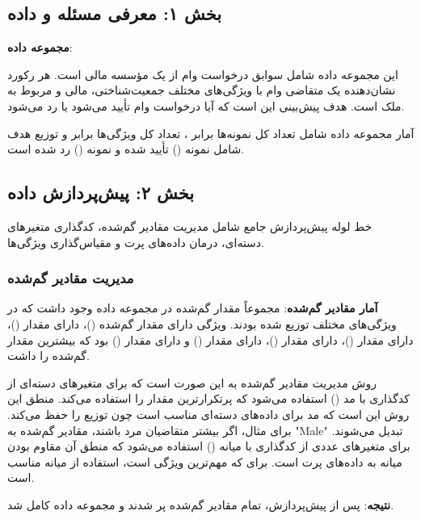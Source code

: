 \documentclass{article}
\begin{document}
\subsection{بخش ۱: معرفی مسئله و داده}

\textbf{مجموعه داده}: 

این مجموعه داده شامل سوابق درخواست وام از یک مؤسسه مالی است. هر رکورد نشان‌دهنده یک متقاضی وام با ویژگی‌های مختلف جمعیت‌شناختی، مالی و مربوط به ملک است. هدف پیش‌بینی این است که آیا درخواست وام تأیید می‌شود یا رد می‌شود.

آمار مجموعه داده شامل تعداد کل نمونه‌ها برابر ، تعداد کل ویژگی‌ها برابر  و توزیع هدف شامل  نمونه () تأیید شده و  نمونه () رد شده است.

\subsection{بخش ۲: پیش‌پردازش داده}

خط لوله پیش‌پردازش جامع شامل مدیریت مقادیر گم‌شده، کدگذاری متغیرهای دسته‌ای، درمان داده‌های پرت و مقیاس‌گذاری ویژگی‌ها.

\subsubsection{مدیریت مقادیر گم‌شده}

\textbf{آمار مقادیر گم‌شده}:
مجموعاً  مقدار گم‌شده در مجموعه داده وجود داشت که در ویژگی‌های مختلف توزیع شده بودند. ویژگی  دارای  مقدار گم‌شده ()،  دارای  مقدار ()،  دارای  مقدار ()،  دارای  مقدار ()،  دارای  مقدار () و  دارای  مقدار () بود که بیشترین مقدار گم‌شده را داشت.

روش مدیریت مقادیر گم‌شده به این صورت است که برای متغیرهای دسته‌ای از کدگذاری با مد () استفاده می‌شود که پرتکرارترین مقدار را استفاده می‌کند. منطق این روش این است که مد برای داده‌های دسته‌ای مناسب است چون توزیع را حفظ می‌کند. برای مثال، اگر بیشتر متقاضیان مرد باشند، مقادیر گم‌شده  به "Male" تبدیل می‌شوند. برای متغیرهای عددی از کدگذاری با میانه () استفاده می‌شود که منطق آن مقاوم بودن میانه به داده‌های پرت است. برای  که مهم‌ترین ویژگی است، استفاده از میانه مناسب است.

\textbf{نتیجه}: پس از پیش‌پردازش، تمام مقادیر گم‌شده پر شدند و مجموعه داده کامل شد.
\end{document}
